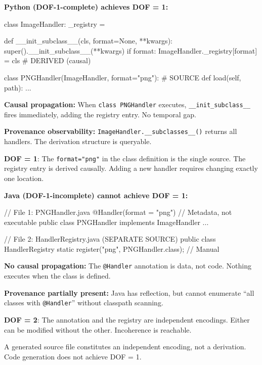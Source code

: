 \textbf{Python (DOF-1-complete) achieves DOF = 1:}

\begin{code}
class ImageHandler:
    _registry = {}

    def __init_subclass__(cls, format=None, **kwargs):
        super().__init_subclass__(**kwargs)
        if format:
            ImageHandler._registry[format] = cls  # DERIVED (causal)

class PNGHandler(ImageHandler, format="png"):  # SOURCE
    def load(self, path): ...
\end{code}

\textbf{Causal propagation:} When \texttt{class PNGHandler} executes, \texttt{\_\_init\_subclass\_\_} fires immediately, adding the registry entry. No temporal gap.

\textbf{Provenance observability:} \texttt{ImageHandler.\_\_subclasses\_\_()} returns all handlers. The derivation structure is queryable.

\textbf{DOF = 1}: The \texttt{format="png"} in the class definition is the single source. The registry entry is derived causally. Adding a new handler requires changing exactly one location.

\textbf{Java (DOF-1-incomplete) cannot achieve DOF = 1:}

\begin{code}
// File 1: PNGHandler.java
@Handler(format = "png")  // Metadata, not executable
public class PNGHandler implements ImageHandler { ... }

// File 2: HandlerRegistry.java (SEPARATE SOURCE)
public class HandlerRegistry {
    static { register("png", PNGHandler.class); }  // Manual
}
\end{code}

\textbf{No causal propagation:} The \texttt{@Handler} annotation is data, not code. Nothing executes when the class is defined.

\textbf{Provenance partially present:} Java has reflection, but cannot enumerate ``all classes with \texttt{@Handler}'' without classpath scanning.

\textbf{DOF = 2}: The annotation and the registry are independent encodings. Either can be modified without the other. Incoherence is reachable.

\begin{theorem}\label{thm:generated-second}
A generated source file constitutes an independent encoding, not a derivation. Code generation does not achieve DOF = 1.
\end{theorem}

